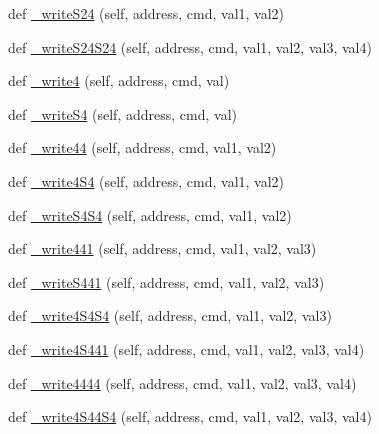 \begin{DoxyCompactItemize}
\item 
def \mbox{\hyperlink{classtoxic__hardware_1_1roboclaw__3_1_1Roboclaw_a626812fa3aa87efaef986cf255ad3d22}{\+\_\+write\+S24}} (self, address, cmd, val1, val2)
\item 
def \mbox{\hyperlink{classtoxic__hardware_1_1roboclaw__3_1_1Roboclaw_a1fa9d2a82fa174514bd5f3ef367b73c5}{\+\_\+write\+S24\+S24}} (self, address, cmd, val1, val2, val3, val4)
\item 
def \mbox{\hyperlink{classtoxic__hardware_1_1roboclaw__3_1_1Roboclaw_aca015407f298b555fcdcf7e381accdbb}{\+\_\+write4}} (self, address, cmd, val)
\item 
def \mbox{\hyperlink{classtoxic__hardware_1_1roboclaw__3_1_1Roboclaw_a81fb1afe5e1466ca8b5c0ac843f0bf0e}{\+\_\+write\+S4}} (self, address, cmd, val)
\item 
def \mbox{\hyperlink{classtoxic__hardware_1_1roboclaw__3_1_1Roboclaw_a3a4108034185a5eb8a7b80c5422012ff}{\+\_\+write44}} (self, address, cmd, val1, val2)
\item 
def \mbox{\hyperlink{classtoxic__hardware_1_1roboclaw__3_1_1Roboclaw_a6a6d3dfaaf28bc1d51257fc17dfd934b}{\+\_\+write4\+S4}} (self, address, cmd, val1, val2)
\item 
def \mbox{\hyperlink{classtoxic__hardware_1_1roboclaw__3_1_1Roboclaw_a729449205a77a93c07e03c1d6bdab3d2}{\+\_\+write\+S4\+S4}} (self, address, cmd, val1, val2)
\item 
def \mbox{\hyperlink{classtoxic__hardware_1_1roboclaw__3_1_1Roboclaw_a108e6195c3b84aecafb43469fa4ca13d}{\+\_\+write441}} (self, address, cmd, val1, val2, val3)
\item 
def \mbox{\hyperlink{classtoxic__hardware_1_1roboclaw__3_1_1Roboclaw_af1265254474337f9be3ae0c19d5d9c57}{\+\_\+write\+S441}} (self, address, cmd, val1, val2, val3)
\item 
def \mbox{\hyperlink{classtoxic__hardware_1_1roboclaw__3_1_1Roboclaw_a41876cbc689dfbf668e00769fd7d39d3}{\+\_\+write4\+S4\+S4}} (self, address, cmd, val1, val2, val3)
\item 
def \mbox{\hyperlink{classtoxic__hardware_1_1roboclaw__3_1_1Roboclaw_a1615d812660e27101d979cd487844650}{\+\_\+write4\+S441}} (self, address, cmd, val1, val2, val3, val4)
\item 
def \mbox{\hyperlink{classtoxic__hardware_1_1roboclaw__3_1_1Roboclaw_ad330056e61340b729bcbbeb8f7e2cd9a}{\+\_\+write4444}} (self, address, cmd, val1, val2, val3, val4)
\item 
def \mbox{\hyperlink{classtoxic__hardware_1_1roboclaw__3_1_1Roboclaw_a670a9338a7f3c6ba48f586f57ea3f6c8}{\+\_\+write4\+S44\+S4}} (self, address, cmd, val1, val2, val3, val4)

\end{DoxyCompactItemize}
